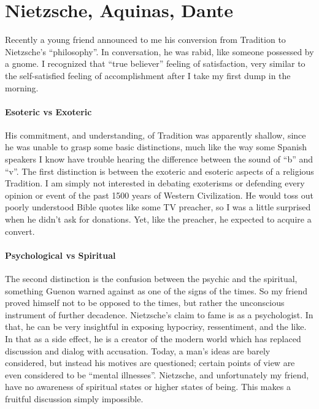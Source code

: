 \section{Nietzsche, Aquinas, Dante}

Recently a young friend announced to me his conversion from Tradition to Nietzsche's ``philosophy''. In conversation, he was rabid, like someone possessed by a gnome. I recognized that ``true believer'' feeling of satisfaction, very similar to the self-satisfied feeling of accomplishment after I take my first dump in the morning.

\paragraph{Esoteric vs Exoteric}


His commitment, and understanding, of Tradition was apparently shallow, since he was unable to grasp some basic distinctions, much like the way some Spanish speakers I know have trouble hearing the difference between the sound of ``b'' and ``v''. The first distinction is between the exoteric and esoteric aspects of a religious Tradition. I am simply not interested in debating exoterisms or defending every opinion or event of the past 1500 years of Western Civilization. He would toss out poorly understood Bible quotes like some TV preacher, so I was a little surprised when he didn't ask for donations. Yet, like the preacher, he expected to acquire a convert.

\paragraph{Psychological vs Spiritual}


The second distinction is the confusion between the psychic and the spiritual, something Guenon warned against as one of the signs of the times. So my friend proved himself not to be opposed to the times, but rather the unconscious instrument of further decadence. Nietzsche's claim to fame is as a psychologist. In that, he can be very insightful in exposing hypocrisy, ressentiment, and the like. In that as a side effect, he is a creator of the modern world which has replaced discussion and dialog with accusation. Today, a man's ideas are barely considered, but instead his motives are questioned; certain points of view are even considered to be ``mental illnesses''. Nietzsche, and unfortunately my friend, have no awareness of spiritual states or higher states of being. This makes a fruitful discussion simply impossible.

